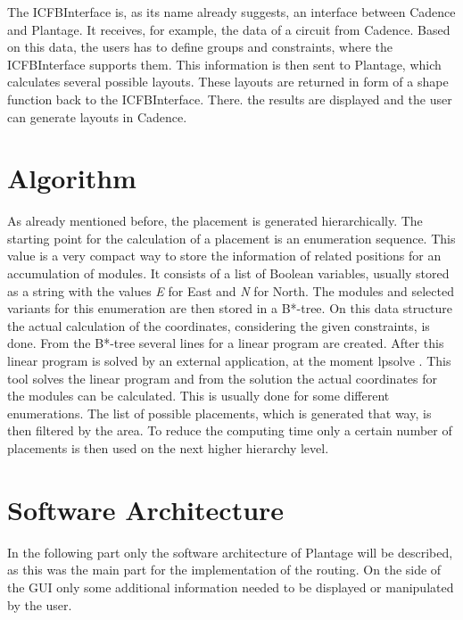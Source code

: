 The ICFBInterface is, as its name already suggests, an interface between Cadence and Plantage. It receives, for example, the data of a circuit from Cadence. Based on this data, the users has to define groups and constraints, where the ICFBInterface supports them. This information is then sent to Plantage, which calculates several possible layouts. These layouts are returned in form of a shape function back to the ICFBInterface. There. the results are displayed and the user can generate layouts in Cadence.

\section{Algorithm}
As already mentioned before, the placement is generated hierarchically. The starting point for the calculation of a placement is an enumeration sequence. This value is a very compact way to store the information of related positions for an accumulation of modules. It consists of a list of Boolean variables, usually stored as a string with the values \textit{E} for East and \textit{N} for North. The modules and selected variants for this enumeration are then stored in a B*-tree. On this data structure the actual calculation of the coordinates, considering the given constraints, is done. From the B*-tree several lines for a linear program are created. After this linear program is solved by an external application, at the moment lp\textunderscore solve \cite{lp_solve}. This tool solves the linear program and from the solution the actual coordinates for the modules can be calculated. This is usually done for some different enumerations. The list of possible placements, which is generated that way, is then filtered by the area. To reduce the computing time only a certain number of placements is then used on the next higher hierarchy level.

\section{Software Architecture}
In the following part only the software architecture of Plantage will be described, as this was the main part for the implementation of the routing. On the side of the GUI only some additional information needed to be displayed or manipulated by the user.


